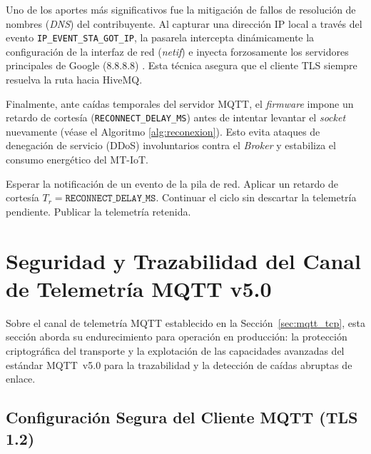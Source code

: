\par Uno de los aportes más significativos fue la mitigación de fallos de resolución de nombres (\textit{DNS}) del contribuyente. Al capturar una dirección IP local a través del evento \texttt{IP\_EVENT\_STA\_GOT\_IP}, la pasarela intercepta dinámicamente la configuración de la interfaz de red (\textit{netif}) e inyecta forzosamente los servidores principales de Google (8.8.8.8) \cite{Espressif_ESP_IDF_v552}. Esta técnica asegura que el cliente TLS siempre resuelva la ruta hacia HiveMQ.\\

\par Finalmente, ante caídas temporales del servidor MQTT, el \textit{firmware} impone un retardo de cortesía (\texttt{RECONNECT\_DELAY\_MS}) antes de intentar levantar el \textit{socket} nuevamente (véase el Algoritmo \ref{alg:reconexion}). Esto evita ataques de denegación de servicio (DDoS) involuntarios contra el \textit{Broker} y estabiliza el consumo energético del MT-IoT.

\begin{algorithm}[htbp]
\caption{Resiliencia y reconexión no bloqueante en la tarea MQTT.}
\label{alg:reconexion}
\begin{algorithmic}[1]
    \State Esperar la notificación de un evento de la pila de red.
        \State Aplicar un retardo de cortesía $T_{r} = \texttt{RECONNECT\_DELAY\_MS}$.
        \State Continuar el ciclo sin descartar la telemetría pendiente.
    \EndIf
    \State Publicar la telemetría retenida.
\EndWhile
\end{algorithmic}
\end{algorithm}

\section{Seguridad y Trazabilidad del Canal de Telemetría MQTT v5.0}

\par Sobre el canal de telemetría MQTT establecido en la Sección~\ref{sec:mqtt_tcp}, esta sección aborda su endurecimiento para operación en producción: la protección criptográfica del transporte y la explotación de las capacidades avanzadas del estándar MQTT~v5.0 para la trazabilidad y la detección de caídas abruptas de enlace.

\subsection{Configuración Segura del Cliente MQTT (TLS 1.2)}

